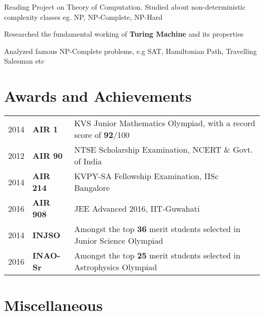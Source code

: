 \documentclass[]{deedy-resume-openfont}
\begin{document}
\begin{minipage}[t]{0.69\textwidth}
\begin{tightemize}
  \item Reading Project on Theory of Computation. Studied about non-deterministic complexity classes eg. NP, NP-Complete, NP-Hard
  \item Researched the fundamental working of \textbf{Turing Machine} and its properties
  \item Analyzed famous NP-Complete problems, e.g SAT, Hamiltonian Path, Travelling Salesman etc 
\end{tightemize}


\section{Awards and Achievements} 
\begin{tabular}{rll}
  2014	   & \textbf{AIR 1}  & KVS Junior Mathematics Olympiad, with a record score of \textbf{92}/100 \\
  2012	   & \textbf{AIR 90} & NTSE Scholarship Examination, NCERT \& Govt. of India \\
  2014	   & \textbf{AIR 214}& KVPY-SA Fellowship Examination, IISc Bangalore \\
  2016     & \textbf{AIR 908}& JEE Advanced 2016, IIT-Guwahati \\
  2014	    & \textbf{INJSO}   & Amongst the top \textbf{36} merit students selected in Junior Science Olympiad   \\
  2016      & \textbf{INAO-Sr} & Amongst the top \textbf{25} merit students selected in Astrophysics Olympiad  \\
\end{tabular}


\section{Miscellaneous}


\end{minipage}
\end{document}
